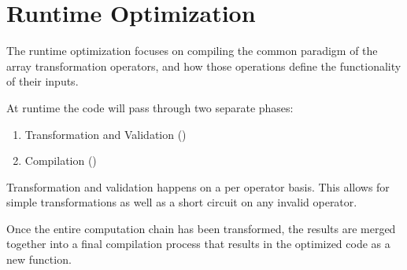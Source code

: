 \section{Runtime Optimization}\label{RuntimeOptimization}
The runtime optimization focuses on compiling the common paradigm of the array transformation operators, and how those operations define the functionality of their inputs.

At runtime the code will pass through two separate phases:

\begin{enumerate}
  \item Transformation and Validation ()
  \item Compilation ()
\end{enumerate}

Transformation and validation happens on a per operator basis.  This allows for simple transformations as well as a short circuit on any invalid operator.

Once the entire computation chain has been transformed, the results are merged together into a final compilation process that results in the optimized code as a new function. 

\begin{minipage}{\linewidth}

\end{minipage}


